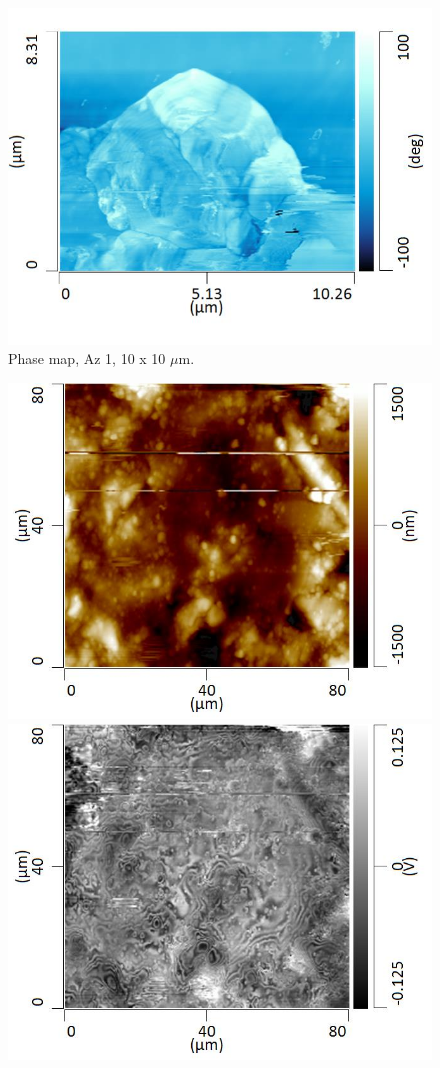 \begin{figure}[H]
\centering
  \includegraphics[width=.45\textwidth]{Az1_tapping_mode_240521_phase_3}
\caption[Phase map, Az 1]{Phase map, Az 1, 10 x 10 $\mu$m.}
\label{fig:afm_az1_phase_3}
\end{figure}


\begin{figure}[H]
\centering
\begin{minipage}{.45\textwidth}
  \centering
  \includegraphics[width=\linewidth]{Az1_tapping_mode_240521_height_4}
\end{minipage}
\begin{minipage}{.45\textwidth}
  \centering
  \includegraphics[width=\linewidth]{Az1_tapping_mode_240521_def_4}

\end{minipage}
\end{figure}
